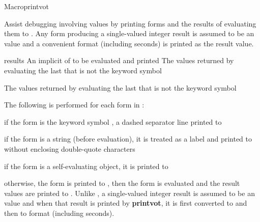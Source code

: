 \documentclass[10pt,twoside,english,pdftex]{article}
\begin{document}
\begin{functiondoc}{Macro}{printvot}{%
    }
% 

\fnsyntax

\fnpurpose Assist debugging involving  values by printing forms and the results of evaluating them to . Any form producing a single-valued integer result is assumed to be an  value and a convenient  format (including seconds) is printed as the result value.

\fnpackage {}

\fnmodule {}

\fnargs
\begin{args}{results}
\arg[forms] An implicit  of  to be
evaluated and printed  
\arg[results] The values returned by evaluating the last 
that is not the keyword symbol 
\end{args}

\fnreturns The values returned by evaluating the last  that is not
the keyword symbol 

\fndescription The following is performed for each form in :
\begin{tightitemize}
\item if the form is the keyword symbol , a dashed separator line
  printed to 
\item if the form is a string (before evaluation), it is treated as a label
  and printed to  without enclosing double-quote
  characters
\item if the form is a self-evaluating object, it is printed to
\item otherwise, the form is printed to , then the
  form is evaluated and the result values are printed to
  .  Unlike \textbf{}, a
  single-valued integer result is assumed to be an  value and when
  that result is printed by \textbf{printvot}, it is first converted to
   and then to
   format (including seconds).
\end{tightitemize}


\end{functiondoc}
\end{document}
